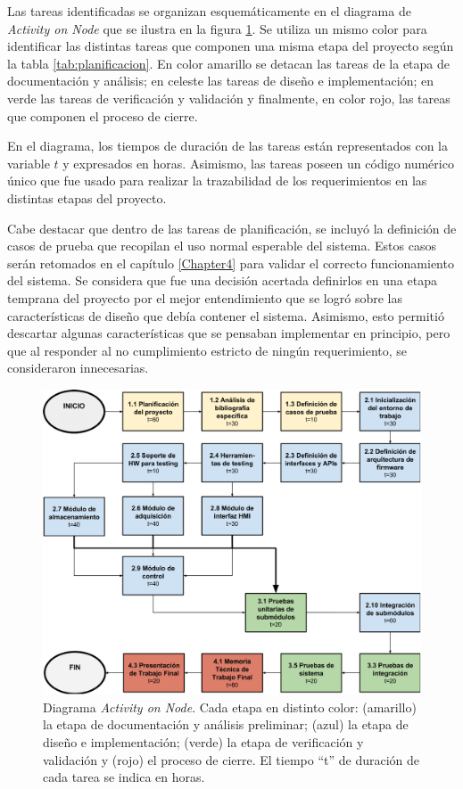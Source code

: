 Las tareas identificadas se organizan esquemáticamente en el diagrama de \textit{Activity on Node} que se ilustra en la figura \ref{fig:AoN}. Se utiliza un mismo color para identificar las distintas tareas que componen una misma etapa del proyecto según la tabla \ref{tab:planificacion}. En color amarillo se detacan las tareas de la etapa de documentación y análisis; en celeste las tareas de diseño e implementación; en verde las tareas de verificación y validación y finalmente, en color rojo, las tareas que componen el proceso de cierre. 

En el diagrama, los tiempos de duración de las tareas están representados con la variable $t$ y expresados en horas. Asimismo, las tareas poseen un código numérico único que fue usado para realizar la trazabilidad de los requerimientos en las distintas etapas del proyecto.

Cabe destacar que dentro de las tareas de planificación, se incluyó la definición de casos de prueba que recopilan el uso normal esperable del sistema.  Estos casos serán retomados en el capítulo \ref{Chapter4} para validar el correcto funcionamiento del sistema.  Se considera que fue una decisión acertada definirlos en una etapa temprana del proyecto por el mejor entendimiento que se logró sobre las características de diseño que debía contener el sistema. Asimismo, esto permitió descartar algunas características que se pensaban implementar en principio, pero que al responder al no cumplimiento estricto de ningún requerimiento, se consideraron innecesarias. 

\vspace{35px}

\begin{figure}[htpb]
	\centering
	\includegraphics[width=\textwidth]{./Figures/AoN.pdf}
	\caption[Diagrama \textit{Activity on Node}.]{Diagrama \textit{Activity on Node}. Cada etapa en distinto color: (amarillo) la etapa de documentación y análisis preliminar; (azul) la etapa de diseño e implementación; (verde) la etapa de verificación y validación y (rojo) el proceso de cierre. El tiempo ``t'' de duración de cada tarea se indica en horas.}
	\label{fig:AoN}
\end{figure}

